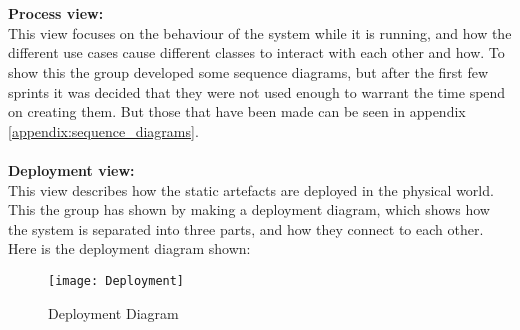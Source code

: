 \\
\\
\textbf{Process view:}
\\
This view focuses on the behaviour of the system while it is running, and
how the different use cases cause different classes to interact with each
other and how. To show this the group developed some sequence diagrams, but
 after the first few sprints it was decided that they were not used enough
 to warrant the time spend on creating them. But those that have been made can be seen in appendix \ref{appendix:sequence_diagrams}.
\\
\\
\textbf{Deployment view:}
\\
This view describes how the static artefacts are deployed in the physical
world. This the group has shown by making a deployment diagram, which shows
how the system is separated into three parts, and how they connect to each
other. Here is the deployment diagram shown:
\begin{figure}
\centerline{\texttt{[image: Deployment]} }
\caption{Deployment Diagram}
\end{figure}
